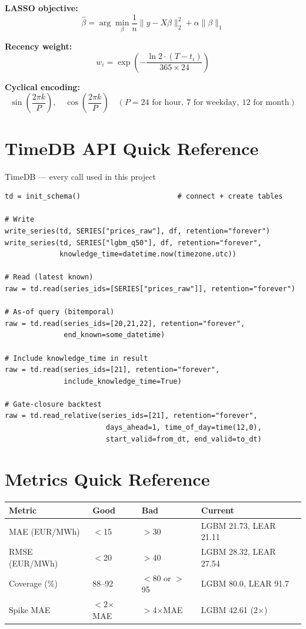 \documentclass[12pt, a4paper, oneside]{memoir}
\begin{document}
\textbf{LASSO objective:}
\[
  \hat{\beta} = \arg\min_\beta \frac{1}{n}\|y-X\beta\|_2^2 + \alpha\|\beta\|_1
\]

\textbf{Recency weight:}
\[
  w_i = \exp\!\left(-\frac{\ln 2\cdot(T-t_i)}{365\times24}\right)
\]

\textbf{Cyclical encoding:}
\[
  \sin\!\left(\frac{2\pi k}{P}\right),\quad\cos\!\left(\frac{2\pi k}{P}\right)
  \quad (P=24\text{ for hour},\ 7\text{ for weekday},\ 12\text{ for month})
\]

\section{TimeDB API Quick Reference}

\begin{codefile}{TimeDB --- every call used in this project}
\begin{verbatim}
td = init_schema()                       # connect + create tables

# Write
write_series(td, SERIES["prices_raw"], df, retention="forever")
write_series(td, SERIES["lgbm_q50"], df, retention="forever",
             knowledge_time=datetime.now(timezone.utc))

# Read (latest known)
raw = td.read(series_ids=[SERIES["prices_raw"]], retention="forever")

# As-of query (bitemporal)
raw = td.read(series_ids=[20,21,22], retention="forever",
              end_known=some_datetime)

# Include knowledge_time in result
raw = td.read(series_ids=[21], retention="forever",
              include_knowledge_time=True)

# Gate-closure backtest
raw = td.read_relative(series_ids=[21], retention="forever",
                        days_ahead=1, time_of_day=time(12,0),
                        start_valid=from_dt, end_valid=to_dt)
\end{verbatim}
\end{codefile}

\section{Metrics Quick Reference}

\begin{center}
\begin{tabular}{llll}
\toprule
\textbf{Metric} & \textbf{Good} & \textbf{Bad} & \textbf{Current} \\
\midrule
MAE (EUR/MWh)  & $<$15  & $>$30  & LGBM 21.73, LEAR 21.11 \\
RMSE (EUR/MWh) & $<$20  & $>$40  & LGBM 28.32, LEAR 27.54 \\
Coverage (\%)  & 88--92 & $<$80 or $>$95 & LGBM 80.0, LEAR 91.7 \\
Spike MAE      & $<$2$\times$MAE & $>$4$\times$MAE & LGBM 42.61 (2$\times$) \\
\bottomrule
\end{tabular}
\end{center}
\end{document}
